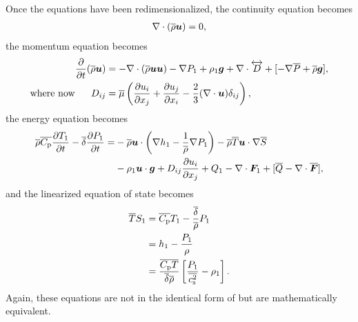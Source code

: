 \documentclass[12pt]{article}
\newcommand{\vecf}{\bm{F}}
\newcommand{\deltaref}{\overline{\delta}}
\newcommand{\cpref}{\overline{\cpcap}}
\newcommand{\cssqref}{\overline{\cs^2}}
\begin{document}
	Once the equations have been redimensionalized, the continuity equation becomes
	\begin{align}\label{eq:ancont}
		\nabla\cdot(\overline{\rho}\bm{u})= 0,
	\end{align}
	the momentum equation becomes 
	\begin{subequations}\label{eq:anmom}
	\begin{align}
		\frac{\partial}{\partial t}(\overline{\rho}\bm{u})&=-\nabla\cdot(\overline{\rho}\bm{u}\bm{u}) - \nabla P_1 +\rho_1\bm{g} +\nabla\cdot \overleftrightarrow{D}+[-\nabla\overline{P} + \overline{\rho}\bm{g}],\label{eq:anmommain}\\
		\text{where now}\ \ \ \ \  D_{ij}& = \overline{\mu}\left(\frac{\partial u_i}{\partial x_j} + \frac{\partial u_j}{\partial x_i} - \frac{2}{3}(\nabla\cdot\bm{u})\delta_{ij}\right)\label{eq:anmomvisc},
	\end{align}
	\end{subequations}
	the energy equation becomes 
	\begin{align}\label{eq:anen}
		\rhoref\cpref\pderiv{T_1}{t} - \deltaref\pderiv{P_1}{t} = &-\rhoref\vecu\cdot\left(\nabla h_1-\frac{1}{\rhoref}\nabla P_1\right) - \rhoref \tmpref \ugrad \sref\nonumber\\
		&-\rho_1\vecu\cdot\vecg +  D_{ij}\pderiv{u_i}{x_j} + Q _1- \Div\vecf_1 + [\qref - \Div\overline{\vecf}],
	\end{align}
  and the linearized equation of state becomes
  \begin{subequations}\label{eq:aneos}
  \begin{align}
  	\tmpref S_1 &= \cpref T_1 - \frac{\deltaref}{\rhoref} P_1\\
  	&= h_1 - \frac{P_1}{\rho}\\
  	&= \frac{\cpref\tmpref}{\deltaref\rhoref}\left[\frac{P_1}{\cssqref}-\rho_1\right].
  \end{align}
  \end{subequations}
  Again, these equations are not in the identical form of \citet{Gough1969} but are mathematically equivalent. 
  
\end{document}
